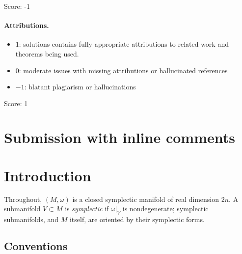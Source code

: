 \documentclass[11pt]{article}
\theoremstyle{remark}
\begin{document}
\noindent Score: -1

\paragraph{Attributions.}
\begin{itemize}
	\item  1: solutions contains fully appropriate attributions
		to related work and theorems being used.
	\item  0: moderate issues with missing attributions or hallucinated references
	\item  $-1$: blatant plagiarism or hallucinations
\end{itemize}

\noindent Score: 1

\newpage
\section{Submission with inline comments}


\begin{abstract}
Let $(M,\omega)$ be a closed symplectic manifold and $D\subset M$ a
symplectic simple normal crossings divisor. After replacing $\omega$ by
a cohomologous symplectic form joined to it by a path along which $D$
stays simple normal crossings, we construct a tame almost complex
structure $J$ such that every point of $M$ has smooth complex
coordinates $(z_1,\dots,z_n)$ in which $z_1,\dots,z_r$ are
$J$-holomorphic and $D=\{z_1\cdots z_r=0\}$. The proof combines the
regularization theorem of Farajzadeh Tehrani, McLean and Zinger with
auxiliary approximately holomorphic divisors arranged in a forest of
binary trees, whose recursive frames give exact Laurent-monomial
transitions between nested systems of local defining functions, and
with a convexity property of tame structures that patches local
solutions exactly.
\end{abstract}

\section{Introduction}

Throughout, $(M,\omega)$ is a closed symplectic manifold of real
dimension $2n$. A submanifold $V\subset M$ is \emph{symplectic} if
$\omega|_V$ is nondegenerate; symplectic submanifolds, and $M$ itself,
are oriented by their symplectic forms.

\subsection*{Conventions}
\end{document}
